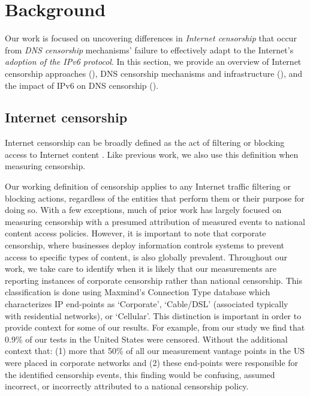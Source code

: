 \section{Background}\label{sec:background}
Our work is focused on uncovering differences in {\em Internet censorship} that occur
from {\em DNS censorship} mechanisms' failure to effectively adapt to the Internet's
{\em adoption of the IPv6 protocol}. In this section, we provide an overview of
Internet censorship approaches (), DNS
censorship mechanisms and infrastructure (), and the
impact of IPv6 on DNS censorship ().

\subsection{Internet censorship}\label{sec:background:censorship}

Internet censorship can be broadly defined as the act of filtering or blocking
access to Internet content \cite{townsend}. Like previous work, we also use
this definition when measuring censorship.

Our working definition of censorship applies to any Internet traffic filtering
or blocking actions, regardless of the entities that perform them or their purpose for doing so. With a few
exceptions, much of prior work has largely focused on measuring censorship with
a presumed attribution of measured events to national content access policies.
However, it is important to note that corporate censorship, where businesses
deploy information controls systems to prevent access to specific types of
content, is also globally prevalent. 
%
Throughout our work, we take care to identify when it is likely that our
measurements are reporting instances of corporate censorship rather than
national censorship.  This classification is done using Maxmind's Connection
Type database \cite{maxmind-connectiondb} which characterizes IP end-points as
`Corporate', `Cable/DSL' (associated typically with residential networks), or
`Cellular'.
%
This distinction is important in order to provide context for some of our
results. For example, from our study we find that 0.9\% of our tests in the
United States were censored. Without the additional context that: (1) more that
50\% of all our measurement vantage points in the US were placed in corporate
networks and (2) these end-points were responsible for the identified
censorship events, this finding would be confusing, assumed incorrect, or
incorrectly attributed to a national censorship policy. 

